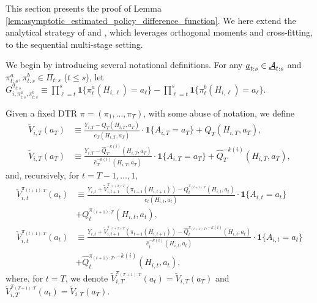 This section presents the proof of Lemma \ref{lem:asymptotic_estimated_policy_difference_function}. We here extend the analytical strategy of \cite{Athey_Wager_2020} and \cite{zhou2022offline}, 
which leverages orthogonal moments and cross-fitting, to the sequential multi-stage setting.

We begin by introducing several notational definitions. For any $\underline{a}_{t:s} \in \underline{\mathcal{A}}_{t:s}$ and $\pi_{t:s}^{a},\pi_{t:s}^{b} \in \Pi_{t:s}$ ($t\leq s$), let $G_{i,\pi_{t:s}^{a},\pi_{t:s}^{b}}^{\underline{a}_{t:s}}  \equiv  \prod_{\ell=t}^{s}\mathbf{1}\{\pi_{\ell}^{a}(H_{i,\ell})=a_\ell\} - \prod_{\ell=t}^{s}\mathbf{1}\{\pi_{\ell}^{b}(H_{i,\ell})=a_\ell\}$.

Given a fixed DTR $\pi=(\pi_1,\ldots,\pi_T)$, with some abuse of notation, we define
\begin{align*}
\widetilde{V}_{i,T}(a_{T}) &\equiv \frac{ Y_{i,T} - Q_{T}(H_{i,T},a_{T}) }{e_{T}(H_{i,T},a_{T})}\cdot \mathbf{1}\{A_{i,T}=a_{T}\} + Q_{T}(H_{i,T},a_{T}),\\
\check{V}_{i,T}(a_{T}) &\equiv \frac{ Y_{i,T} - \widehat{Q}_{T}^{-k(i)}(H_{i,T},a_{T}) }{\hat{e}_{T}^{-k(i)}(H_{i,T},a_{T})}\cdot \mathbf{1}\{A_{i,T}=a_{T}\} + \widehat{Q}_{T}^{-k(i)}(H_{i,T},a_{T}),
\end{align*}
and, recursively, for $t=T-1,\ldots,1$,
\begin{align*}
\widetilde{V}_{i,t}^{\pi_{(t+1):T}}(a_{t}) &\equiv \frac{ Y_{i,t} + \widetilde{V}_{i,t+1}^{\pi_{(t+2):T}}(\pi_{t+1}(H_{i,t+1})) - Q_{t}^{\pi_{(t+1):T}}(H_{i,t},a_{t}) }{e_{t}(H_{i,t},a_{t})}\cdot \mathbf{1}\{A_{i,t} = a_{t}\} \\
&+ Q_{t}^{\pi_{(t+1):T}}(H_{i,t},a_{t}),\\
\check{V}_{i,t}^{\pi_{(t+1):T}}(a_t) &\equiv \frac{ Y_{i,t} + \widetilde{V}_{i,t+1}^{\pi_{(t+2):T}}(\pi_{t+1}(H_{i,t+1})) - \widehat{Q}_{t}^{\pi_{(t+1):T},-k(i)}(H_{i,t},a_{t}) }{\hat{e}_{t}^{-k(i)}(H_{i,t},a_{t})}\cdot \mathbf{1}\{A_{i,t} = a_{t}\} \\
&+ \widehat{Q}_{t}^{\pi_{(t+1):T},-k(i)}(H_{i,t},a_{t}),
\end{align*}
where, for $t=T$, we denote $\widetilde{V}_{i,T}^{\pi_{(T+1):T}}(a_{t}) = \widetilde{V}_{i,T}(a_{T})$ and $\check{V}_{i,T}^{\pi_{(T+1):T}}(a_{t}) = \check{V}_{i,T}(a_{T})$.

